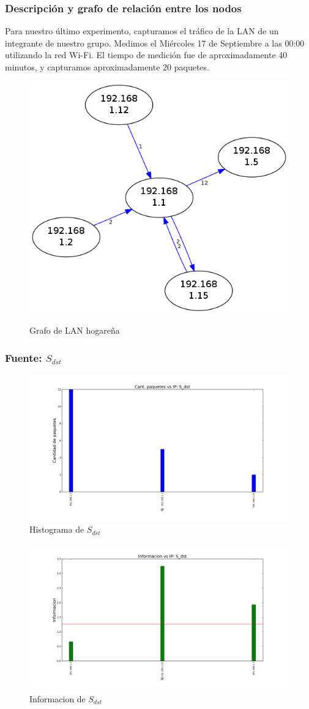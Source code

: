 \subsubsection{Descripción y grafo de relación entre los nodos}

Para nuestro último experimento, capturamos el tráfico de la LAN de un integrante de nuestro grupo. Medimos el Miércoles 17 de Septiembre a las 00:00 utilizando la red Wi-Fi. El tiempo de medición fue de aproximadamente 40 minutos, y capturamos aproximadamente 20 paquetes.

\begin{figure}[H]
  \begin{center}
    \includegraphics[width=0.3\linewidth]{../imgs/red-hogarena_red.png}
    \label{fig:FedeGrafo}
    \caption{Grafo de LAN hogareña}
  \end{center}
\end{figure}

\subsubsection{Fuente: $S_{dst}$}

\begin{figure}[H]\centering
    \includegraphics[width=0.8\linewidth]{../imgs/red-hogarena_S_dst_hist.png}
    \caption{Histograma de $S_{dst}$}\label{fig:Fede-dst-hist}
\end{figure}

\begin{figure}[H]\centering
    \includegraphics[width=0.8\linewidth]{../imgs/red-hogarena_S_dst_info.png}
    \caption{Informacion de $S_{dst}$}\label{fig:Fede-dst-info}
\end{figure}

